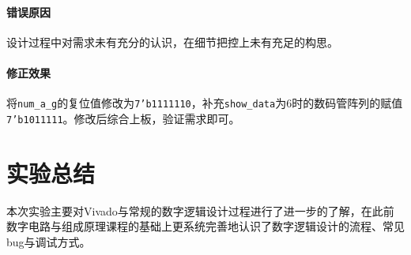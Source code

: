 \documentclass[UTF-8,twoside,c5size]{ctexart}
\begin{document}
	\paragraph{错误原因}\hfill
	
	设计过程中对需求未有充分的认识，在细节把控上未有充足的构思。
	
	\paragraph{修正效果}\hfill
	
	将\texttt{num\_a\_g}的复位值修改为\texttt{7'b1111110}，补充\texttt{show\_data}为6时的数码管阵列的赋值\texttt{7'b1011111}。修改后综合上板，验证需求即可。
	
	\section{实验总结}
	
	本次实验主要对Vivado与常规的数字逻辑设计过程进行了进一步的了解，在此前数字电路与组成原理课程的基础上更系统完善地认识了数字逻辑设计的流程、常见bug与调试方式。
\end{document}

